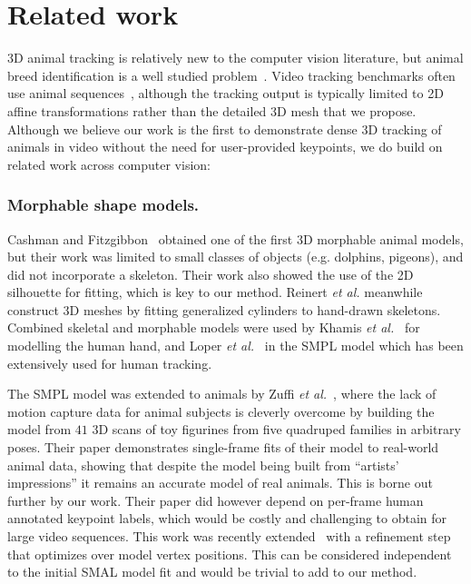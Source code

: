 \section{Related work}
3D animal tracking is relatively new to the computer vision literature, but animal breed identification is a well studied problem~\cite{imagenet_cvpr09}. Video tracking benchmarks often use animal sequences~\cite{DAVIS2017-1st,DAVIS2017-2nd}, although the tracking output is typically limited to 2D affine transformations rather than the detailed 3D mesh that we propose.  Although we believe our work is the first to demonstrate dense 3D tracking of animals in video without the need for user-provided keypoints, we do build on related work across computer vision:

\subsubsection*{Morphable shape models.}
Cashman and Fitzgibbon~\cite{cashman2013shape} obtained one of the first 3D morphable animal models, but their work was limited to small classes of objects (e.g. dolphins, pigeons), and did not incorporate a skeleton.  Their work also showed the use of the 2D silhouette for fitting, which is key to our method. 
Reinert {\em et al.} \cite{reinert2016animated} meanwhile construct 3D meshes by fitting generalized cylinders to hand-drawn skeletons.
Combined skeletal and morphable models were used by Khamis {\em et al.}~\cite{hand-shape} for modelling the human hand, and Loper {\em et al.}~\cite{loper15smpl} in the SMPL model which has been extensively used for human tracking. 

The SMPL model was extended to animals by Zuffi {\em et al.}~\cite{zuffi2017menagerie}, where the lack of motion capture data for animal subjects is cleverly overcome by building the model from $41$ 3D scans of toy figurines from five quadruped families in arbitrary poses. Their paper demonstrates single-frame fits of their model to real-world animal data, showing that despite the model being built from ``artists' impressions'' it remains an accurate model of real animals. This is borne out further by our work.  Their paper did however depend on per-frame human annotated keypoint labels, which would be costly and challenging to obtain for large video sequences. This work was recently extended~\cite{zuffi_lions} with a refinement step that optimizes over model vertex positions. This can be considered independent to the initial SMAL model fit and would be trivial to add to our method.

